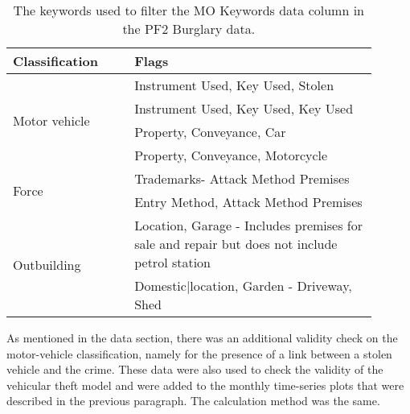 \begin{table}[]
\centering
\begin{tabular}{p{0.3\linewidth}|p{0.6\linewidth}}
\toprule
Classification                    & Flags                                                                                     \\ \midrule
\multirow{4}{*}{Motor vehicle}    & Instrument Used, Key Used, Stolen                                                            \\
                                  & Instrument Used, Key Used, Key Used                                                          \\
                                  & Property, Conveyance, Car                                                                    \\
                                  & Property, Conveyance, Motorcycle                                                             \\ \midrule
\multirow{2}{*}{Force}       & Trademarks- Attack Method Premises                                                           \\
                                  & Entry Method, Attack Method Premises                                                         \\ \midrule
\multirow{2}{*}{Outbuilding} & Location, Garage - Includes premises for sale and repair but does not include petrol station \\
                                  & Domestic|location, Garden - Driveway, Shed                                                   \\ \bottomrule
\end{tabular}
\caption[Burglary Keywords]{\label{tab:burg_keywords}The keywords used to filter the MO Keywords data column in the PF2 Burglary data. }
\end{table}


As mentioned in the data section, there was an additional validity check on the motor-vehicle classification, namely for the presence of a link between a stolen vehicle and the crime. These data were also used to check the validity of the vehicular theft model and were added to the monthly time-series plots that were described in the previous paragraph. The calculation method was the same.   

